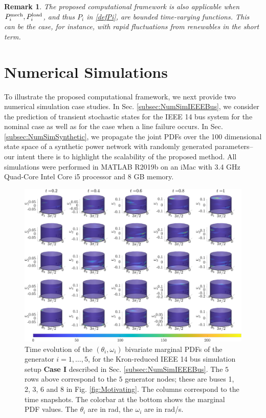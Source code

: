 \documentclass[10pt,twocolumn]{IEEEtran}
\newtheorem{remark}{Remark}
\begin{document}
\begin{remark}\label{remark:timevaryingEffectivePowerInput}
The proposed computational framework is also applicable when $P_{i}^{\rm{mech}}, P_{i}^{\rm{load}}$, and thus $P_{i}$ in \eqref{defPi}, are bounded time-varying functions. This can be the case, for instance, with rapid fluctuations from renewables in the short term.
\end{remark}



\section{Numerical Simulations}\label{sec:NumericalSimulations}
To illustrate the proposed computational framework, we next provide two numerical simulation case studies. In Sec. \ref{subsec:NumSimIEEEBus}, we consider the prediction of transient stochastic states for the IEEE 14 bus system for the nominal case as well as for the case when a line failure occurs. In Sec. \ref{subsec:NumSimSynthetic}, we propagate the joint PDFs over the 100 dimensional state space of a synthetic power network with randomly generated parameters--our intent there is to highlight the scalability of the proposed method. All simulations were performed in MATLAB R2019b on an iMac with 3.4 GHz Quad-Core Intel Core i5 processor and 8 GB memory. 



\begin{figure}[t]
\centering
\includegraphics[width=0.75\linewidth]{IEEE14marginalsCase0.png}
\caption{\small{Time evolution of the $(\theta_{i},\omega_{i})$ bivariate marginal PDFs of the generator $i=1,\hdots,5$, for the Kron-reduced IEEE 14 bus simulation setup \textbf{Case I} described in Sec. \ref{subsec:NumSimIEEEBus}. The $5$ rows above correspond to the $5$ generator nodes; these are buses 1, 2, 3, 6 and 8 in Fig. \ref{fig:Motivating}. The columns correspond to the time snapshots. The colorbar at the bottom shows the marginal PDF values. The $\theta_i$ are in rad, the $\omega_i$ are in rad/s.}}
\vspace*{-0.1in}
\label{fig:IEEE14marginalsCase0}
\end{figure}
\end{document}
